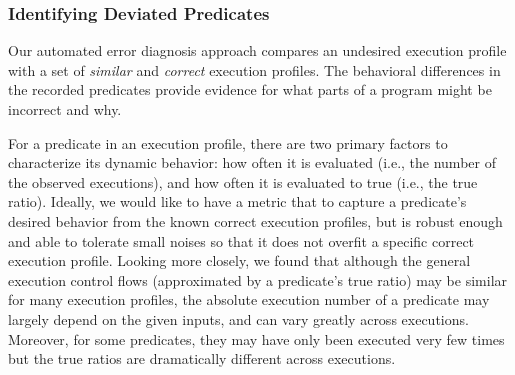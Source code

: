 


\subsubsection{Identifying Deviated Predicates}
\label{sec:deviation}


Our
automated error diagnosis approach compares an undesired execution profile with a set
of \textit{similar} and \textit{correct} execution profiles. 
The behavioral differences in the recorded predicates provide evidence for what parts of a program might be
incorrect and why. %

For a predicate in an execution profile,
there are two primary factors to
characterize its dynamic behavior: how often it is
evaluated (i.e., the number of the
observed executions), and how often it is evaluated to true (i.e., the true ratio).
Ideally, we would like to have a metric that
to capture a predicate's desired behavior
from the known correct execution profiles, but is robust enough and
able to tolerate small noises so that it does
not overfit a specific correct execution profile.
Looking more closely, we found that although
the general execution control flows (approximated by
a predicate's true ratio) may be similar for many 
execution profiles, the absolute execution
number of a predicate may largely depend on the given inputs, and
can vary greatly across executions. Moreover, for
some predicates, they may have
only been executed very few times but the true ratios
are dramatically different across executions.



